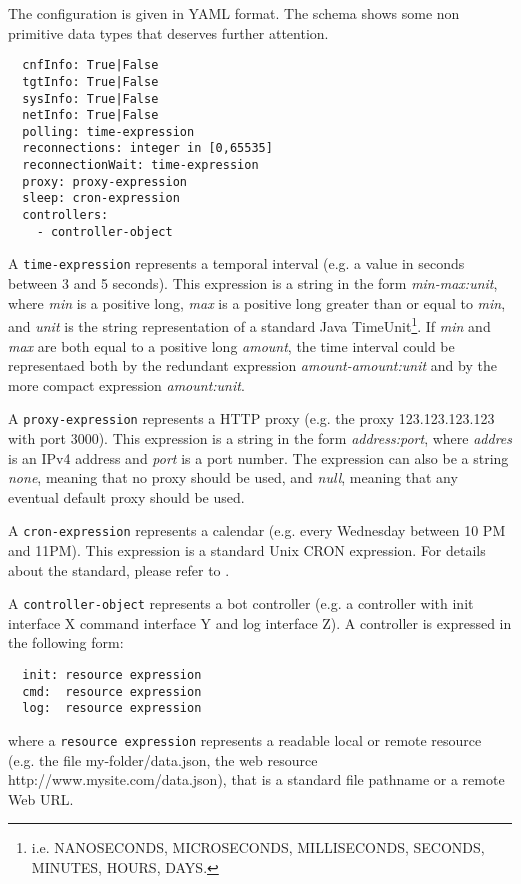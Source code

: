 The configuration is given in YAML format. The schema shows some non primitive data types that deserves further attention.

\begin{verbatim}
  cnfInfo: True|False
  tgtInfo: True|False
  sysInfo: True|False
  netInfo: True|False
  polling: time-expression
  reconnections: integer in [0,65535]
  reconnectionWait: time-expression
  proxy: proxy-expression
  sleep: cron-expression
  controllers:
    - controller-object
\end{verbatim}

A \texttt{time-expression} represents a temporal interval (e.g. a value in seconds between 3 and 5 seconds). This expression is a string in the form \textit{min-max:unit}, where \textit{min} is a positive long, \textit{max} is a positive long greater than or equal to \textit{min}, and \textit{unit} is the string representation of a standard Java TimeUnit\footnote{i.e. NANOSECONDS, MICROSECONDS, MILLISECONDS, SECONDS, MINUTES, HOURS, DAYS.}. If \textit{min} and \textit{max} are both equal to a positive long \textit{amount}, the time interval could be representaed both by the redundant expression \textit{amount-amount:unit} and by the more compact expression \textit{amount:unit}.

A \texttt{proxy-expression} represents a HTTP proxy (e.g. the proxy 123.123.123.123 with port 3000). This expression is a string in the form \textit{address:port}, where \textit{addres} is an IPv4 address and \textit{port} is a port number. The expression can also be a string \textit{none}, meaning that no proxy should be used, and \textit{null}, meaning that any eventual default proxy should be used.

A \texttt{cron-expression} represents a calendar (e.g. every Wednesday between 10 PM and 11PM). This expression is a standard Unix CRON expression. For details about the standard, please refer to \cite{cron-expression}.

A \texttt{controller-object} represents a bot controller (e.g. a controller with init interface X command interface Y and log interface Z). A controller is expressed in the following form:

\begin{verbatim}
  init: resource expression
  cmd:  resource expression
  log:  resource expression
\end{verbatim}

where a \texttt{resource expression} represents a readable local or remote resource (e.g. the file my-folder/data.json, the web resource http://www.mysite.com/data.json), that is a standard file pathname or a remote Web URL.

